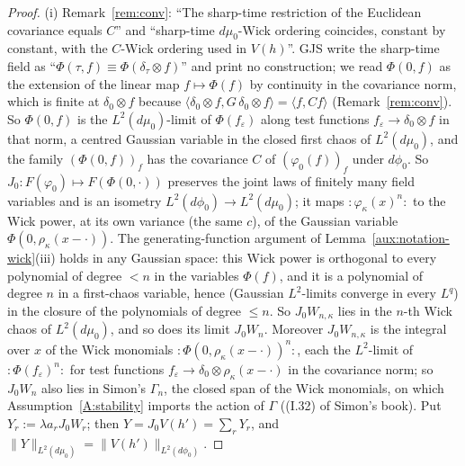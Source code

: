 \documentclass[11pt,a4paper]{article}
\theoremstyle{plain}
\theoremstyle{definition}
\theoremstyle{plain}
\theoremstyle{definition}
\newcommand{\ip}[2]{\langle #1,#2\rangle}
\newcommand{\dmu}{d\mu_0}
\newcommand{\dphi}{d\phi_0}
\begin{document}
\begin{proof}
(i) Remark~\ref{rem:conv}: ``The sharp-time restriction of the Euclidean
covariance equals $C$'' and ``sharp-time $d\mu_0$-Wick ordering coincides, constant by constant,
with the $C$-Wick ordering used in $V(h)$''.  GJS write the sharp-time field as
``$\Phi(\tau,f)\equiv\Phi(\delta_\tau\otimes f)$'' \cite[p.~589]{GJS} and print no construction;
we read $\Phi(0,f)$ as the extension of the linear map $f\mapsto\Phi(f)$ by continuity in the
covariance norm, which is finite at $\delta_0\otimes f$ because
$\ip{\delta_0\otimes f}{G\,\delta_0\otimes f}=\ip f{Cf}$ (Remark~\ref{rem:conv}).  So $\Phi(0,f)$ is the
$L^2(\dmu)$-limit of $\Phi(f_\varepsilon)$ along test functions $f_\varepsilon\to\delta_0\otimes
f$ in that norm, a centred Gaussian variable in the closed first chaos of $L^2(\dmu)$, and the
family $(\Phi(0,f))_f$ has the covariance $C$ of $(\varphi_0(f))_f$ under $\dphi$.  So $J_0:F(\varphi_0)\mapsto F(\Phi(0,\cdot))$
preserves the joint laws of finitely many field variables and is an isometry
$L^2(\dphi)\to L^2(\dmu)$; it maps ${:}\varphi_\kappa(x)^n{:}$ to the Wick power, at its own
variance (the same $c$), of the Gaussian variable $\Phi(0,\rho_\kappa(x-\cdot))$.  The
generating-function argument of Lemma~\ref{aux:notation-wick}(iii) holds in any Gaussian space:
this Wick power is orthogonal to every polynomial of degree $<n$ in the variables $\Phi(f)$, and
it is a polynomial of degree $n$ in a first-chaos variable, hence (Gaussian $L^2$-limits converge
in every $L^q$) in the closure of the polynomials of degree $\le n$.  So $J_0W_{n,\kappa}$ lies in
the $n$-th Wick chaos of $L^2(\dmu)$, and so does its limit $J_0W_n$.  Moreover $J_0W_{n,\kappa}$
is the integral over $x$ of the Wick monomials ${:}\Phi(0,\rho_\kappa(x-\cdot))^n{:}$, each the
$L^2$-limit of ${:}\Phi(f_\varepsilon)^n{:}$ for test functions $f_\varepsilon\to\delta_0\otimes
\rho_\kappa(x-\cdot)$ in the covariance norm; so $J_0W_n$ also lies in Simon's $\Gamma_n$, the
closed span of the Wick monomials, on which Assumption~\ref{A:stability} imports the action
of $\Gamma$ ((I.32) of Simon's book).  Put
$Y_r:=\lambda a_rJ_0W_r$; then $Y=J_0V(h')=\sum_rY_r$, and $\|Y\|_{L^2(\dmu)}=\|V(h')\|_{L^2(\dphi)}$.


\end{proof}
\end{document}
